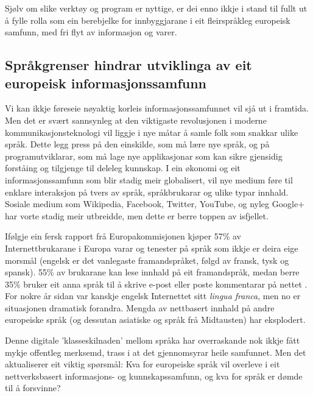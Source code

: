 \begin{multicols}{2}
Sjølv om slike verktøy og program er nyttige, er dei enno ikkje i stand til fullt ut å fylle rolla som ein berebjelke for innbyggjarane i eit fleirspråkleg europeisk samfunn, med fri flyt av informasjon og varer. 

\subsection[Språkgrenser hindrar utviklinga av eit europeisk informasjonssamfunn ]{Språkgrenser hindrar utviklinga av eit europeisk informasjonssamfunn }

Vi kan ikkje føreseie nøyaktig korleis informasjonssamfunnet vil sjå ut i framtida. Men det er svært sannsynleg at den viktigaste revolusjonen i moderne kommunikasjonsteknologi vil liggje i nye måtar å samle folk som snakkar ulike språk. Dette legg press på den einskilde, som må lære nye språk, og på programutviklarar, som må lage nye applikasjonar som kan sikre gjensidig forståing og tilgjenge til deleleg kunnskap. I ein økonomi og eit informasjonssamfunn som blir stadig meir globalisert, vil nye medium føre til enklare interaksjon på tvers av språk, språkbrukarar og ulike typar innhald. Sosiale medium som Wikipedia, Facebook, Twitter, YouTube, og nyleg Google+ har vorte stadig meir utbreidde, men dette er berre toppen av isfjellet.


Ifølgje ein fersk rapport frå Europakommisjonen kjøper 57\% av Internettbrukarane i Europa varar og tenester på språk som ikkje er deira eige morsmål (engelsk er det vanlegaste framandspråket, følgd av fransk, tysk og spansk). 55\% av brukarane kan lese innhald på eit framandspråk, medan berre 35\% bruker eit anna språk til å skrive e-post eller poste kommentarar på nettet \cite{EC1}. For nokre år sidan var kanskje engelsk Internettet sitt \textit{lingua franca}, men no er situasjonen dramatisk forandra. Mengda av nettbasert innhald på andre europeiske språk (og dessutan asiatiske og språk frå Midtausten) har eksplodert. 

Denne digitale 'klasseskilnaden' mellom språka har overraskande nok ikkje fått mykje offentleg merksemd, trass i at det gjennomsyrar heile samfunnet. Men det aktualiserer eit viktig spørsmål: Kva for europeiske språk vil overleve i eit nettverksbasert informasjons- og kunnskapssamfunn, og kva for språk er dømde til å forsvinne?


\end{multicols}
